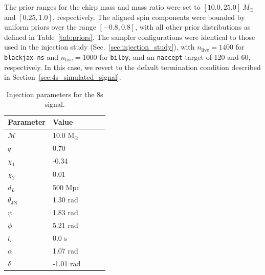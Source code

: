 \documentclass[fleqn,usenatbib]{mnras}
\begin{document}
The prior ranges for the chirp mass and mass ratio were set to
$[10.0, 25.0]~M_{\odot}$ and $[0.25, 1.0]$, respectively. The aligned
spin components were bounded by uniform priors over the range
$[-0.8, 0.8]$, with all other prior distributions as defined in
Table~\ref{tab:priors}. The sampler configurations were identical to
those used in the injection study (Sec.~\ref{sec:injection_study}), with
$n_{\text{live}}=1400$ for \texttt{blackjax-ns} and
$n_{\text{live}}=1000$ for \texttt{bilby}, and an \texttt{naccept}
target of 120 and 60, respectively. In this case, we revert to the 
default termination condition described in Section~\ref{sec:4s_simulated_signal}.

\begin{table}
    \centering
    \caption{Injection parameters for the 8s signal.}
    \label{tab:8s_injection_params}
    \begin{tabular}{l l l c c}
    \hline
    \hline
    \textbf{Parameter} & \textbf{Value} \\
    \hline
    $\mathcal{M}$ & 10.0 M$_{\odot}$ \\
    $q$ & 0.70 \\
    $\chi_1$ & -0.34 \\
    $\chi_2$ & 0.01 \\
    $d_L$ & 500 Mpc \\
    $\theta_{\textrm{JN}}$ & 1.30 rad \\
    $\psi$ & 1.83 rad \\
    $\phi$ & 5.21 rad \\
    $t_c$ & 0.0 s\\
    $\alpha$ & 1.07 rad \\
    $\delta$ & -1.01 rad \\
    \hline
    \hline
    \end{tabular}
    \end{table}
\end{document}
